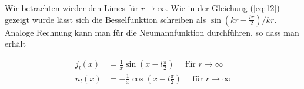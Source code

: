 Wir betrachten wieder den Limes für \(r\to\infty\). Wie in der Gleichung (\ref{eq:12}) gezeigt wurde lässt sich die Besselfunktion schreiben als \(\sin(kr-\frac{l\pi}{2})/kr \). Analoge Rechnung kann man für die Neumannfunktion durchführen, so dass man erhält

\begin{align}
j_l(x) &= \frac{1}{x}\sin\left(x - l\frac{\pi}{2}\right) \quad \text{ für }r\to\infty  \label{eq:23} \\
n_l(x) &= - \frac{1}{x}\cos\left(x - l\frac{\pi}{2}\right)\quad \text{ für }r\to\infty \label{eq:24}
\end{align}



